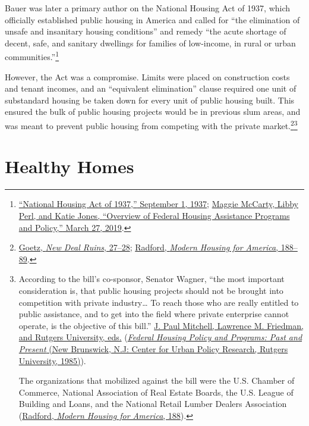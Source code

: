 \documentclass[
  openany]{book}
\begin{document}
Bauer was later a primary author on the National Housing Act of 1937, which officially established public housing in America and called for ``the elimination of unsafe and insanitary housing conditions'' and remedy ``the acute shortage of decent, safe, and sanitary dwellings for families of low-income, in rural or urban communities.''\footnote{\protect\hyperlink{ref-national1937}{{``National Housing Act of 1937,''} September 1, 1937}; \protect\hyperlink{ref-mccarty2019}{Maggie McCarty, Libby Perl, and Katie Jones, {``Overview of Federal Housing Assistance Programs and Policy,''} March 27, 2019}.}

However, the Act was a compromise. Limits were placed on construction costs and tenant incomes, and an ``equivalent elimination'' clause required one unit of substandard housing be taken down for every unit of public housing built. This ensured the bulk of public housing projects would be in previous slum areas, and was meant to prevent public housing from competing with the private market.\footnote{\protect\hyperlink{ref-goetz2013}{Goetz, \emph{New Deal Ruins}, 27--28}; \protect\hyperlink{ref-radford1996}{Radford, \emph{Modern Housing for America}, 188--89}.}\footnote{According to the bill's co-sponsor, Senator Wagner, ``the most important consideration is, that public housing projects should not be brought into competition with private industry\ldots{} To reach those who are really entitled to public assistance, and to get into the field where private enterprise cannot operate, is the objective of this bill.'' \protect\hyperlink{ref-federal1985}{J. Paul Mitchell, Lawrence M. Friedman, and Rutgers University, eds.} (\protect\hyperlink{ref-federal1985}{\emph{Federal Housing Policy and Programs: Past and Present} (New Brunswick, N.J: Center for Urban Policy Research, Rutgers University, 1985)}).

  The organizations that mobilized against the bill were the U.S. Chamber of Commerce, National Association of Real Estate Boards, the U.S. League of Building and Loans, and the National Retail Lumber Dealers Association (\protect\hyperlink{ref-radford1996}{Radford, \emph{Modern Housing for America}, 188}).}

\hypertarget{healthy-homes}{%
\section{Healthy Homes}\label{healthy-homes}}
\end{document}
